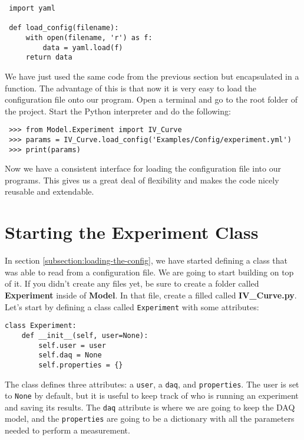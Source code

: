 \begin{verbatim}
 import yaml
 
 def load_config(filename):
     with open(filename, 'r') as f:
         data = yaml.load(f)
     return data
\end{verbatim}

We have just used the same code from the previous section but encapsulated in a function. The advantage of this is that now it is very easy to load the configuration file onto our program. Open a terminal and go to the root folder of the project. Start the Python interpreter and do the following:

\begin{verbatim}
 >>> from Model.Experiment import IV_Curve
 >>> params = IV_Curve.load_config('Examples/Config/experiment.yml')
 >>> print(params)
\end{verbatim}

Now we have a consistent interface for loading the configuration file into our programs. This gives us a great deal of flexibility and makes the code nicely reusable and extendable. 


\section{Starting the Experiment Class}\label{starting-the-experimentclass}
In section \ref{subsection:loading-the-config}, we have started defining a class that was able to read from a configuration file. We are going to start building on top of it. If you didn't create any files yet, be sure to create a folder called \textbf{Experiment} inside of \textbf{Model}. In that file, create a filled called  \textbf{IV\_Curve.py}. Let's start by defining a class called \texttt{Experiment} with some attributes: 

\begin{verbatim}
class Experiment:
    def __init__(self, user=None):
        self.user = user
        self.daq = None
        self.properties = {}
\end{verbatim}

The class defines three attributes: a \texttt{user}, a \texttt{daq}, and \texttt{properties}. The user is set to \texttt{None} by default, but it is useful to keep track of who is running an experiment and saving its results. The \texttt{daq} attribute is where we are going to keep the DAQ model, and the \texttt{properties} are going to be a dictionary with all the parameters needed to perform a measurement. 


